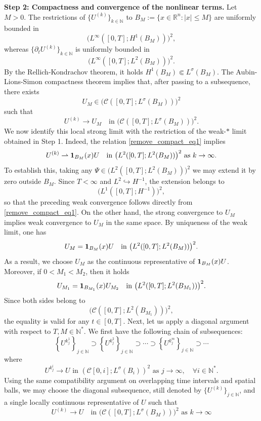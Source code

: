 \documentclass[11pt,reqno]{amsart}
\newcommand{\ity}{\infty}
\begin{document}
	\noindent \textbf{Step 2: Compactness and convergence of the nonlinear terms.} Let $M>0$. The restrictions of $\{U^{(k)}\}_{k\in \mathbb N}$ to $B_M:=\{x\in \mathbb R^n:|x|\leq M\}$ are uniformly bounded in
	\[
	\bigl(L^\infty([0,T];H^1(B_M))\bigr)^2,
	\]
	whereas $\{\partial_tU^{(k)}\}_{k\in \mathbb N}$ is uniformly bounded in
	\[
	\bigl(L^\infty([0,T];L^2(B_M))\bigr)^2.
	\]
	By the Rellich-Kondrachov theorem, it holds $H^1(B_M)\Subset L^{\sigma}(B_M)$. The Aubin-Lions-Simon compactness theorem implies that, after passing to a subsequence, there exists
	\[
	U_M\in\bigl(\mathcal{C}([0,T];L^{\sigma}(B_M))\bigr)^2
	\]
	such that
	\[
	U^{(k)}\to U_M
	\quad\text{in }\bigl(\mathcal{C}([0,T];L^{\sigma}(B_M))\bigr)^2.
	\]
	We now identify this local strong limit with the restriction of the weak-$*$ limit obtained in Step 1. Indeed, the relation \eqref{remove_compact_eq1} implies
	\[
	U^{(k)}\rightharpoonup {\bf 1}_{B_M}(x)U
	\quad\text{in }\bigl(L^2([0,T];L^2(B_M))\bigr)^2\text{ as }k\to \ity.
	\]
	To establish this, taking any $\Psi\in\bigl(L^2([0,T];L^2(B_M))\bigr)^2$ we may extend it by zero outside $B_M$. Since $T<\infty$ and $L^2\hookrightarrow H^{-1}$, the extension belongs to 
	\[
	\bigl(L^1([0,T];H^{-1})\bigr)^2,
	\]
	so that the preceding weak convergence follows directly from \eqref{remove_compact_eq1}. On the other hand, the strong convergence to $U_M$ implies weak convergence to $U_M$ in the same space. By uniqueness of the weak limit, one has
	\[
	U_M={\bf 1}_{B_M}(x)U\quad\text{in }\bigl(L^2([0,T];L^2(B_M))\bigr)^2.
	\]
	As a result, we choose $U_M$ as the continuous representative of ${\bf 1}_{B_M}(x)U$. Moreover, if $0<M_1<M_2$, then it holds
	\[
	U_{M_1}={\bf 1}_{B_{M_1}}(x)U_{M_2}
	\quad\text{in }\bigl(L^2([0,T];L^2(B_{M_1}))\bigr)^2.
	\]
	Since both sides belong to 
	\[
	\bigl(\mathcal{C}([0,T];L^2(B_{M_1}))\bigr)^2,
	\]
	the equality is valid for any $t\in[0,T]$. Next, let us apply a diagonal argument with respect to $T,M\in\mathbb N^*$. We first have the following chain of subsequences:
	\[
	\left\{U^{k^1_{j}}\right\}_{j\in \mathbb N}\supset \left\{U^{k^2_{j}}\right\}_{j\in \mathbb N} \supset\cdots\supset \left\{U^{k^m_{j}}\right\}_{j\in \mathbb N}\supset \cdots
	\]
	where
	\[
	U^{k^i_j}\to U \text{ in }(\mathcal{C}[0,i];L^\sigma(B_i))^2\text{ as }j\to \ity,\quad\forall i\in \mathbb N^*.
	\]
	Using the same compatibility argument on overlapping time intervals and spatial balls, we may choose the diagonal subsequence, still denoted by $\{U^{(k)}\}_{j\in \mathbb N}$, and a single locally continuous representative of $U$ such that
	\begin{equation}\label{remove_compact_eq4}
		U^{(k)}\to U
		\quad\text{in }\bigl(\mathcal{C}([0,T];L^{\sigma}(B_M))\bigr)^2\text{ as }k\to \ity
	\end{equation}
\end{document}
